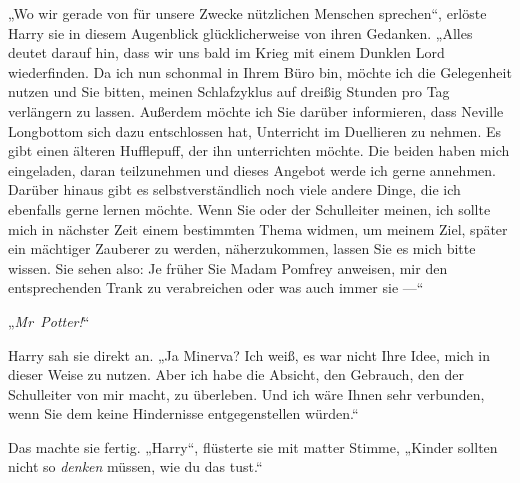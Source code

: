„Wo wir gerade von für unsere Zwecke nützlichen Menschen sprechen“, erlöste Harry sie in diesem Augenblick glücklicherweise von ihren Gedanken.
„Alles deutet darauf hin, dass wir uns bald im Krieg mit einem Dunklen Lord wiederfinden. Da ich nun schonmal in Ihrem Büro bin, möchte ich die Gelegenheit nutzen und Sie bitten, meinen Schlafzyklus auf dreißig Stunden pro Tag verlängern zu lassen. Außerdem möchte ich Sie darüber informieren, dass Neville Longbottom sich dazu entschlossen hat, Unterricht im Duellieren zu nehmen. Es gibt einen älteren Hufflepuff, der ihn unterrichten möchte. Die beiden haben mich eingeladen, daran teilzunehmen und dieses Angebot werde ich gerne annehmen. Darüber hinaus gibt es selbstverständlich noch viele andere Dinge, die ich ebenfalls gerne lernen möchte. Wenn Sie oder der Schulleiter meinen, ich sollte mich in nächster Zeit einem bestimmten Thema widmen, um meinem Ziel, später ein mächtiger Zauberer zu werden, näherzukommen, lassen Sie es mich bitte wissen. Sie sehen also: Je früher Sie Madam Pomfrey anweisen, mir den entsprechenden Trank zu verabreichen oder was auch immer sie —“

„\emph{Mr~Potter!}“

Harry sah sie direkt an.
„Ja Minerva? Ich weiß, es war nicht Ihre Idee, mich in dieser Weise zu nutzen. Aber ich habe die Absicht, den Gebrauch, den der Schulleiter von mir macht, zu überleben. Und ich wäre Ihnen sehr verbunden, wenn Sie dem keine Hindernisse entgegenstellen würden.“

Das machte sie fertig.
„Harry“, flüsterte sie mit matter Stimme,
„Kinder sollten nicht so \emph{denken} müssen, wie du das tust.“

